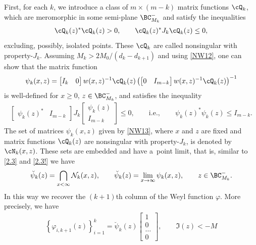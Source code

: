 First, for each $ k $, we introduce a class of
$m \times (m-k)$ matrix functions $\cQ_k$, which are meromorphic in some semi-plane $\BC^{-}_{M_k}$ and satisfy the inequalities
\begin{gather}
\cQ_k (z)^*
  \cQ_k(z)
 > 0, \qquad
  \cQ_k (z)^*
  J_k
  \cQ_k (z)
\leq 0,
 \label{NW12}
\end{gather}
excluding, possibly, isolated points. These $\cQ_k$ are called nonsingular with property-$J_k$.
Assu\-ming $M_k>2M_0/(d_k-d_{k+1})$ and using \eqref{NW12}, one can show that the matrix function
\begin{gather}
  \psi_k (x,z)
= \begin{bmatrix}I_k &0 \end{bmatrix}
 w (x,z)^{-1}
 \cQ_k (z)
 \left(
  \begin{bmatrix}0 &I_{m-k} \end{bmatrix}
  w (x,z)^{-1}
  \cQ_k(z)
 \right)^{-1}
 \label{NW13}
\end{gather}
is well-def\/ined for $x \geq 0$, $z \in \BC^{-}_{M_k}$, and satisf\/ies the inequality
\begin{gather}
\begin{bmatrix} \psi_k (z)^* &I_{m-k} \end{bmatrix}
 J_k
 \left[
  \begin{matrix}
    \psi_k (z) \\
    I_{m-k}
  \end{matrix}
 \right]
\leq 0 , \qquad {\mathrm{i.e.,}} \qquad \psi_k (z)^*
  \psi_k (z)
\leq I_{m-k} .
 \label{NW14}
\end{gather}
The set of matrices $\psi_k(x,z)$ given by \eqref{NW13}, where $x$ and $z$ are f\/ixed and matrix functions $\cQ_k(z)$ are nonsingular with property-$J_k$, is denoted
by $\cN_k(x,z)$. These sets are embedded and have a~point limit, that is, similar to \eqref{2.3} and \eqref{2.3!} we have
 \begin{gather}
  \breve \psi_k(z) = \bigcap\limits_{x < \infty}
           {\cal N}_k (x,z), \qquad \breve \psi_k(z)=\lim_{x\to \infty} \psi_k(x,z),
\qquad
  z \in \BC_{M_k}^{-} .
 \label{NW15}
\end{gather}
In this way we recover the $(k+1)$th column of the Weyl function $\varphi$. More precisely, we have
\begin{gather}
  \left\{
   \varphi_{i, k+1}(z)
  \right\}_{i=1}^k
 = \breve \psi_k (z)\begin{bmatrix} 1\\ 0 \\ \ldots \\0
 \end{bmatrix}, \qquad \Im(z)<-M \label{NW16}
\end{gather}
